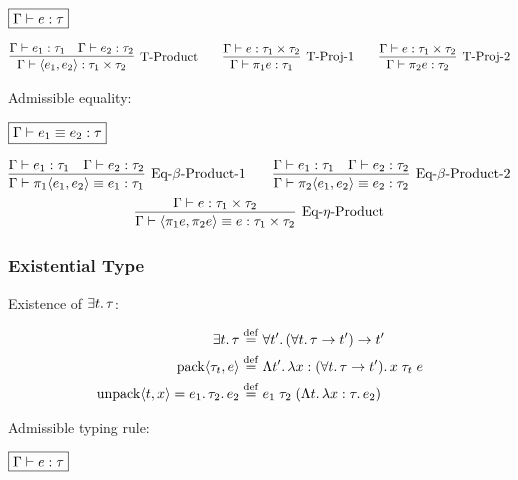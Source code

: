 $\fbox{$\Gamma \vdash e: \tau$}$

\begin{gather*}
  \infer[\text{T-Product}]{\Gamma \vdash \langle e_1, e_2\rangle: \tau_1 \times \tau_2}{
    \Gamma \vdash e_1: \tau_1
    &
    \Gamma \vdash e_2: \tau_2
  }
  \hspace{2em}
  \infer[\text{T-Proj-1}]{\Gamma \vdash \pi_1 e: \tau_1}{
    \Gamma \vdash e: \tau_1 \times \tau_2
  }
  \hspace{2em}
  \infer[\text{T-Proj-2}]{\Gamma \vdash \pi_2 e: \tau_2}{
    \Gamma \vdash e: \tau_1 \times \tau_2
  }
\end{gather*}

Admissible equality:

$\fbox{$\Gamma \vdash e_1 \equiv e_2: \tau$}$

\begin{gather*}
  \infer[\text{Eq-$\beta$-Product-1}]{\Gamma \vdash \pi_1 \langle e_1, e_2\rangle \equiv e_1: \tau_1}{
    \Gamma \vdash e_1: \tau_1
    &
    \Gamma \vdash e_2: \tau_2
  }
  \hspace{2em}
  \infer[\text{Eq-$\beta$-Product-2}]{\Gamma \vdash \pi_2 \langle e_1, e_2\rangle \equiv e_2: \tau_2}{
    \Gamma \vdash e_1: \tau_1
    &
    \Gamma \vdash e_2: \tau_2
  }
  \\
  \infer[\text{Eq-$\eta$-Product}]{\Gamma \vdash \langle \pi_1 e, \pi_2 e\rangle \equiv e: \tau_1 \times \tau_2}{
    \Gamma \vdash e: \tau_1 \times \tau_2
  }
\end{gather*}

\subsubsection{Existential Type}

Existence of $\exists t\ldotp\tau$:

\begin{align*}
  \exists t\ldotp \tau &\mathrel{\overset{\mathrm{def}}{=}} \forall t'\ldotp (\forall t\ldotp \tau \to t') \to t' \\
  \mathop{\mathrm{pack}}\langle \tau_t, e\rangle &\mathrel{\overset{\mathrm{def}}{=}} \Lambda t'\ldotp \lambda x: (\forall t\ldotp \tau \to t')\ldotp x\; \tau_t\; e \\
  \mathop{\mathrm{unpack}}\langle t, x\rangle = e_1\ldotp \tau_2\ldotp e_2 &\mathrel{\overset{\mathrm{def}}{=}} e_1\; \tau_2\; (\Lambda t\ldotp \lambda x: \tau\ldotp e_2)
\end{align*}

Admissible typing rule:

$\fbox{$\Gamma \vdash e: \tau$}$

